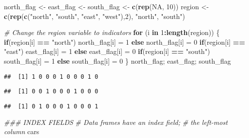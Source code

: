\documentclass[11pt,]{article}
\newenvironment{Shaded}{\begin{snugshade}}{\end{snugshade}}
\newcommand{\CommentTok}[1]{\textcolor[rgb]{0.56,0.35,0.01}{\textit{#1}}}
\newcommand{\ControlFlowTok}[1]{\textcolor[rgb]{0.13,0.29,0.53}{\textbf{#1}}}
\newcommand{\DecValTok}[1]{\textcolor[rgb]{0.00,0.00,0.81}{#1}}
\newcommand{\KeywordTok}[1]{\textcolor[rgb]{0.13,0.29,0.53}{\textbf{#1}}}
\newcommand{\NormalTok}[1]{#1}
\newcommand{\OperatorTok}[1]{\textcolor[rgb]{0.81,0.36,0.00}{\textbf{#1}}}
\newcommand{\OtherTok}[1]{\textcolor[rgb]{0.56,0.35,0.01}{#1}}
\newcommand{\StringTok}[1]{\textcolor[rgb]{0.31,0.60,0.02}{#1}}
\begin{document}
\begin{Shaded}
\begin{Highlighting}[]
\NormalTok{  north_flag <-}\StringTok{ }\NormalTok{east_flag <-}\StringTok{ }\NormalTok{south_flag <-}\StringTok{ }\KeywordTok{c}\NormalTok{(}\KeywordTok{rep}\NormalTok{(}\OtherTok{NA}\NormalTok{, }\DecValTok{10}\NormalTok{))}
\NormalTok{  region <-}\StringTok{ }\KeywordTok{c}\NormalTok{(}\KeywordTok{rep}\NormalTok{(}\KeywordTok{c}\NormalTok{(}\StringTok{"north"}\NormalTok{, }\StringTok{"south"}\NormalTok{, }\StringTok{"east"}\NormalTok{, }\StringTok{"west"}\NormalTok{),}\DecValTok{2}\NormalTok{), }\StringTok{"north"}\NormalTok{, }\StringTok{"south"}\NormalTok{)}
  
  \CommentTok{# Change the region variable to indicators}
  \ControlFlowTok{for}\NormalTok{ (i }\ControlFlowTok{in} \DecValTok{1}\OperatorTok{:}\KeywordTok{length}\NormalTok{(region)) \{}
    \ControlFlowTok{if}\NormalTok{(region[i] }\OperatorTok{==}\StringTok{ "north"}\NormalTok{) north_flag[i] =}\StringTok{ }\DecValTok{1}
    \ControlFlowTok{else}\NormalTok{ north_flag[i] =}\StringTok{ }\DecValTok{0}
    \ControlFlowTok{if}\NormalTok{(region[i] }\OperatorTok{==}\StringTok{ "east"}\NormalTok{) east_flag[i] =}\StringTok{ }\DecValTok{1}
    \ControlFlowTok{else}\NormalTok{ east_flag[i] =}\StringTok{ }\DecValTok{0}
    \ControlFlowTok{if}\NormalTok{(region[i] }\OperatorTok{==}\StringTok{ "south"}\NormalTok{) south_flag[i] =}\StringTok{ }\DecValTok{1}
    \ControlFlowTok{else}\NormalTok{ south_flag[i] =}\StringTok{ }\DecValTok{0}
\NormalTok{  \}}
\NormalTok{  north_flag; east_flag; south_flag}
\end{Highlighting}
\end{Shaded}

\begin{verbatim}
##  [1] 1 0 0 0 1 0 0 0 1 0
\end{verbatim}

\begin{verbatim}
##  [1] 0 0 1 0 0 0 1 0 0 0
\end{verbatim}

\begin{verbatim}
##  [1] 0 1 0 0 0 1 0 0 0 1
\end{verbatim}

\begin{Shaded}
\begin{Highlighting}[]
\CommentTok{### INDEX FIELDS}
  \CommentTok{# Data frames have an index field;}
  \CommentTok{# the left-most column}
\NormalTok{  cars}
\end{Highlighting}
\end{Shaded}
\end{document}

